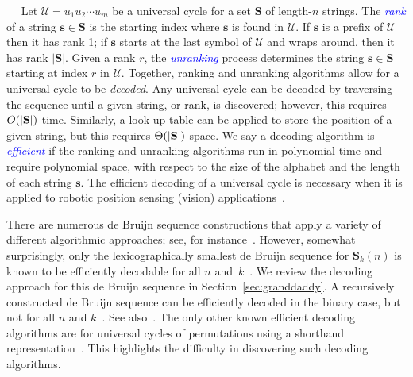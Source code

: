 \documentclass[US-letter,USenglish,authorcolumns,autoref]{lipics-v2021}
\newcommand{\bS}{\mathbf{S}}
\newcommand{\bs}{\mathbf{s}}
\newcommand{\red}[1] {\textcolor{red}{#1}}
\newcommand{\defo}[1] {\emph{\textcolor{blue}{#1}}}
\begin{document}
\medskip
~~
%
Let $\mathcal{U}=u_1u_2\cdots u_m$ be a universal cycle for a set $\mathbf{S}$ of length-$n$ strings.
The \defo{rank} of a string $\bs \in \bS$ is the starting index where $\bs$ is found in $\mathcal{U}$.  If $\bs$ is a prefix of $\mathcal{U}$ then it has rank 1; if $\bs$ starts at the last symbol of $\mathcal{U}$ and wraps around, then it has rank $|\mathbf{S}|$. Given a rank $r$, the \defo{unranking} process determines the string $\bs \in \bS$ starting at index $r$ in $\mathcal{U}$.  Together, ranking and unranking algorithms allow for a universal cycle to be \emph{decoded}.   Any universal cycle can be decoded by traversing the sequence until a given string, or rank, is discovered; however, this requires $O(|{\bf S}|)$ time.  Similarly, a look-up table can be applied to store the position of a given string, but this requires $\Theta(|{\bf S}|)$  space.  We say a decoding algorithm is \defo{efficient} if the ranking and unranking algorithms run in polynomial time and require polynomial space, with respect to the size of the alphabet and the length of each string $\bs$. %
%
The efficient decoding of a universal cycle is necessary when it is applied to robotic position sensing (vision) applications~\cite{BM,magic}.

 There are numerous de Bruijn sequence constructions that apply a variety of different algorithmic approaches; see, for instance~\cite{fred-nfsr,etzion-book,dbseq}.
However, somewhat surprisingly, only the lexicographically smallest de Bruijn sequence for $\bS_k(n)$ is known to be efficiently decodable for all $n$ and~$k$~\cite{kociumaka,ranking}. We review the decoding approach for this de Bruijn sequence in Section~\ref{sec:granddaddy}.
%
A recursively constructed de Bruijn sequence can be efficiently decoded in the binary case, but not for all $n$ and $k$~\cite{mitchell-decode,tuliani-decode}. See also~\cite[p.317, ex.97-99]{knuth}.
%
The only other known efficient decoding algorithms are for universal cycles of permutations using a shorthand representation~\cite{shorthand,shorthand2}.  This highlights the difficulty in discovering such decoding algorithms.
\end{document}
